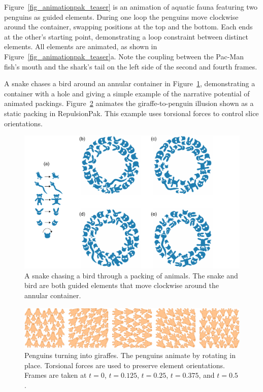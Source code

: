 Figure~\ref{fig_animationpak_teaser} is an animation of aquatic fauna featuring two
penguins as guided elements.  During one loop the penguins move clockwise
around the container, swapping positions at the top and the bottom.
Each ends at the other's starting point, demonstrating a loop constraint
between distinct elements.  All elements are animated, as shown in 
Figure~\ref{fig_animationpak_teaser}a.  Note the coupling between the Pac-Man fish's
mouth and the shark's tail on the left side of the second and fourth frames.

A snake chases a bird around an annular container in 
Figure~\ref{fig_animationpak_chasing_bird}, demonstrating a container with a hole
and giving a simple example of the narrative potential of animated
packings.  Figure~\ref{fig_animationpak_penguin_giraffe} animates the giraffe-to-penguin
illusion shown as a static packing in RepulsionPak.  This example
uses torsional forces to control slice orientations.

\begin{figure}
\vspace{-10pt}
\centering
\includegraphics[width=1.0\textwidth]{figures/animationpak/chasing_bird.pdf} 
\caption[An animated packing of a snake chases a bird]
{\label{fig_animationpak_chasing_bird} 
A snake chasing a bird through a packing of animals.  The snake and bird 
  are both guided elements that move clockwise around the annular 
  container.}
\end{figure}

\begin{figure}
\centering
\includegraphics[width=1.0\textwidth]{figures/animationpak/penguin_giraffe.pdf} 
\caption[An animated packing of the penguins-to-giraffes illusion]
{\label{fig_animationpak_penguin_giraffe} 
Penguins turning into giraffes.  The penguins animate by rotating in place.
Torsional forces are used to preserve element orientations.
Frames are taken at $t=0$, $t=0.125$, $t=0.25$, $t=0.375$, and $t=0.5$. 
}
\end{figure}

